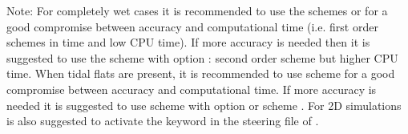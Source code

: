 \begin{WarningBlock}{Note:}
  For completely wet cases it is recommended to use the schemes {} or
 {} for a good compromise between accuracy and computational time
 (i.e. first order schemes in time and low CPU time). If more accuracy is needed
 then
 it is suggested to use the scheme {} with option {}:
 second order scheme but higher CPU time.
 When tidal flats are present, it is recommended to use scheme {}
 for a good compromise between accuracy and computational time. If more accuracy
 is needed it is suggested to use scheme {} with option {}
 or scheme {}.
 For 2D simulations is also suggested to activate the keyword  in the steering file of .
\end{WarningBlock}

